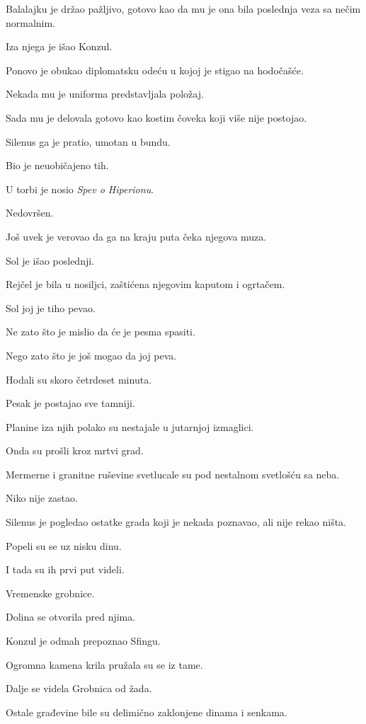 Balalajku je držao pažljivo, gotovo kao da mu je ona bila poslednja veza sa nečim normalnim.

Iza njega je išao Konzul.

Ponovo je obukao diplomatsku odeću u kojoj je stigao na hodočašće.

Nekada mu je uniforma predstavljala položaj.

Sada mu je delovala gotovo kao kostim čoveka koji više nije postojao.

Silenus ga je pratio, umotan u bundu.

Bio je neuobičajeno tih.

U torbi je nosio \emph{Spev o Hiperionu}.

Nedovršen.

Još uvek je verovao da ga na kraju puta čeka njegova muza.

Sol je išao poslednji.

Rejčel je bila u nosiljci, zaštićena njegovim kaputom i ogrtačem.

Sol joj je tiho pevao.

Ne zato što je mislio da će je pesma spasiti.

Nego zato što je još mogao da joj peva.

\bigskip

Hodali su skoro četrdeset minuta.

Pesak je postajao sve tamniji.

Planine iza njih polako su nestajale u jutarnjoj izmaglici.

Onda su prošli kroz mrtvi grad.

Mermerne i granitne ruševine svetlucale su pod nestalnom svetlošću sa neba.

Niko nije zastao.

Silenus je pogledao ostatke grada koji je nekada poznavao, ali nije rekao ništa.

Popeli su se uz nisku dinu.

I tada su ih prvi put videli.

Vremenske grobnice.

\bigskip

Dolina se otvorila pred njima.

Konzul je odmah prepoznao Sfingu.

Ogromna kamena krila pružala su se iz tame.

Dalje se videla Grobnica od žada.

Ostale građevine bile su delimično zaklonjene dinama i senkama.

